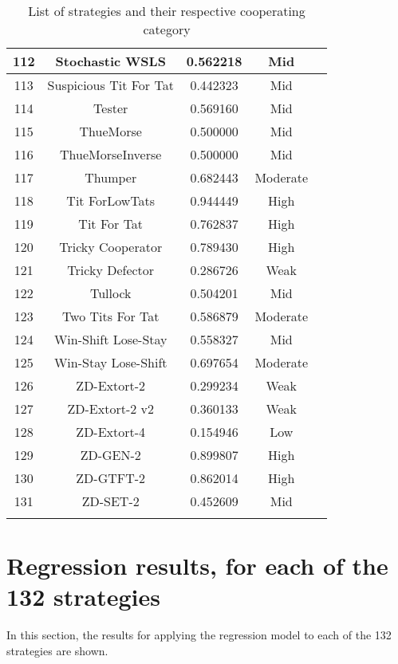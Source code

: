\begin{longtable}{ccccc}
			112 & Stochastic WSLS             & 0.562218          & Mid     \\ \hline
			113 & Suspicious Tit For Tat      & 0.442323          & Mid     \\ \hline
			114 & Tester                      & 0.569160          & Mid     \\ \hline
			115 & ThueMorse                   & 0.500000          & Mid     \\ \hline
			116 & ThueMorseInverse            & 0.500000          & Mid     \\ \hline
			117 & Thumper                     & 0.682443          & Moderate \\ \hline
			118 & Tit ForLowTats              & 0.944449          & High     \\ \hline
			119 & Tit For Tat                 & 0.762837          & High     \\ \hline
			120 & Tricky Cooperator           & 0.789430          & High     \\ \hline
			121 & Tricky Defector             & 0.286726          & Weak     \\ \hline
			122 & Tullock                     & 0.504201          & Mid     \\ \hline
			123 & Two Tits For Tat            & 0.586879          & Moderate \\ \hline
			124 & Win-Shift Lose-Stay         & 0.558327          & Mid     \\ \hline
			125 & Win-Stay Lose-Shift         & 0.697654          & Moderate \\ \hline
			126 & ZD-Extort-2                 & 0.299234          & Weak     \\ \hline
			127 & ZD-Extort-2 v2              & 0.360133          & Weak     \\ \hline
			128 & ZD-Extort-4                 & 0.154946          & Low      \\ \hline
			129 & ZD-GEN-2                    & 0.899807          & High     \\ \hline
			130 & ZD-GTFT-2                   & 0.862014          & High     \\ \hline
			131 & ZD-SET-2                    & 0.452609          & Mid     \\ \hline
		\caption{List of strategies and their respective cooperating category}
		\label{class-cat}
		\end{longtable}

\section{Regression results, for each of the 132 strategies}
\label{append:reg-results-strategies}
In this section, the results for applying the regression model to each of the
132 strategies are shown.

